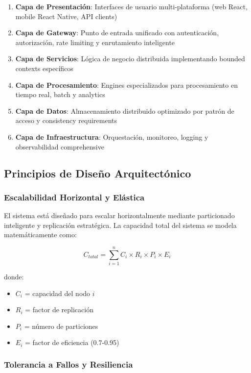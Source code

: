 \begin{enumerate}[leftmargin=*, itemsep=0.15cm]
\item \textbf{Capa de Presentación}: Interfaces de usuario multi-plataforma (web React, mobile React Native, API clients)
\item \textbf{Capa de Gateway}: Punto de entrada unificado con autenticación, autorización, rate limiting y enrutamiento inteligente
\item \textbf{Capa de Servicios}: Lógica de negocio distribuida implementando bounded contexts específicos
\item \textbf{Capa de Procesamiento}: Engines especializados para procesamiento en tiempo real, batch y analytics
\item \textbf{Capa de Datos}: Almacenamiento distribuido optimizado por patrón de acceso y consistency requirements
\item \textbf{Capa de Infraestructura}: Orquestación, monitoreo, logging y observabilidad comprehensive
\end{enumerate}

\subsection{Principios de Diseño Arquitectónico}
\label{subsec:principios_diseno}

\subsubsection{Escalabilidad Horizontal y Elástica}

El sistema está diseñado para escalar horizontalmente mediante particionado inteligente y replicación estratégica. La capacidad total del sistema se modela matemáticamente como:

\begin{equation}
C_{total} = \sum_{i=1}^{n} C_i \times R_i \times P_i \times E_i
\end{equation}

donde:
\begin{itemize}[leftmargin=*, itemsep=0.05cm]
\item $C_i$ = capacidad del nodo $i$
\item $R_i$ = factor de replicación
\item $P_i$ = número de particiones
\item $E_i$ = factor de eficiencia (0.7-0.95)
\end{itemize}

\subsubsection{Tolerancia a Fallos y Resiliencia}

